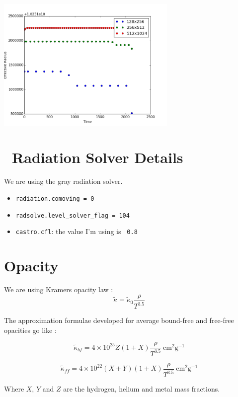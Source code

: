 \documentclass[11pt]{article}
\newcommand{\castro}{{\sffamily{Castro}}}
\begin{document}
\includegraphics[width=0.65\textwidth]{ReffvsT.png}

\section{\castro\ Radiation Solver Details}

We are using the gray radiation solver.  
\begin{itemize}
\item {\tt radiation.comoving = 0} 
\item {\tt radsolve.level\_solver\_flag = 104} 
\item {\tt castro.cfl}: the value I'm using is {\tt
  0.8}
\end{itemize}


\section{Opacity}

We are using Kramers opacity law \cite{carroll2007introduction}:
\begin{equation}
  \tilde{\kappa} = \tilde{\kappa}_0 \frac{\rho}{T^{3.5}} 
\end{equation}

The approximation formulae developed for average bound-free and free-free opacities go like \cite{hansen2004stellar}:

\begin{equation}
  \tilde{\kappa}_{bf} = 4 \times 10^{25} Z(1+X) \frac{\rho}{T^{3.5}} ~\mathrm{cm^{2}g^{-1}}
\end{equation}

\begin{equation}
  \tilde{\kappa}_{ff} = 4 \times 10^{22} (X+Y)(1+X) \frac{\rho}{T^{3.5}} ~\mathrm{cm^{2}g^{-1}}
\end{equation}

Where $X$, $Y$ and $Z$ are the hydrogen, helium and metal mass fractions. 
\end{document}

